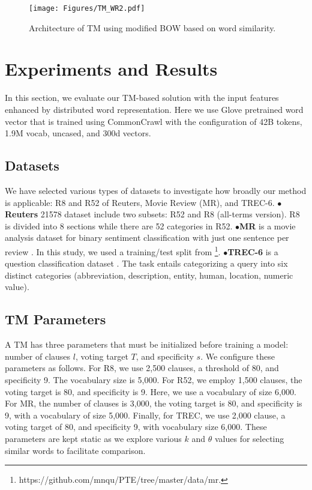 \documentclass[11pt]{article}
\begin{document}
\begin{figure*}[h]
    \centering
    \texttt{[image: Figures/TM\_WR2.pdf]}
    \caption{Architecture of TM using modified BOW based on word similarity.}
    \label{fig66}
\end{figure*}






\section{Experiments and Results}\label{exp}
In this section, we evaluate our TM-based solution with the input features enhanced by distributed word representation. Here we use Glove pretrained word vector that is trained using CommonCrawl with the configuration of 42B tokens, 1.9M vocab, uncased, and 300d vectors. \subsection{Datasets}
We have selected various types of datasets to investigate how broadly our method is applicable: R8 and R52 of Reuters, Movie Review (MR), and TREC-6. $\bullet$  \textbf{ Reuters} 21578 dataset include two subsets: R52 and R8 (all-terms version). R8 is divided into 8 sections while there are 52 categories in R52. 
    $\bullet$\textbf{MR} is a movie analysis dataset for binary sentiment classification with just one sentence per review \cite{10.3115/1219840.1219855}. In this study, we used a training/test split from \cite{jianPTE}\footnote{https://github.com/mnqu/PTE/tree/master/data/mr.}.
    $\bullet$\textbf{TREC-6} is a question classification dataset \cite{li2002}. The task entails categorizing a query into six distinct categories (abbreviation, description, entity, human, location, numeric value). 



\subsection{TM Parameters}
A TM has three parameters that must be initialized before training a model: number of clauses $l$, voting target $T$, and specificity $s$. We configure these parameters as follows. For R8, we use 2,500 clauses, a threshold of 80, and specificity 9. The vocabulary size is 5,000. For R52, we employ  1,500 clauses, the voting target is 80, and specificity is 9. Here, we use a vocabulary of size 6,000. For MR, the number of clauses is 3,000, the voting target is 80, and specificity is 9, with a vocabulary of size 5,000. Finally, for TREC, we use 2,000 clause, a voting target of 80, and specificity 9, with vocabulary size 6,000. These parameters are kept static as we explore various $k$ and $\theta$ values for selecting similar words to facilitate comparison. 
\end{document}
